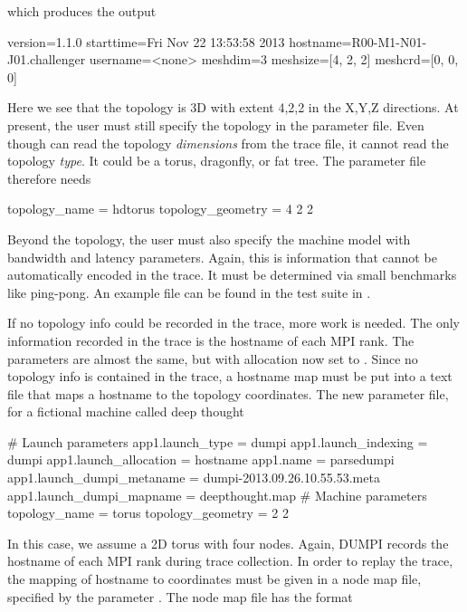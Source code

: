 which produces the output

\begin{ViFile}
version=1.1.0
starttime=Fri Nov 22 13:53:58 2013
hostname=R00-M1-N01-J01.challenger
username=<none>
meshdim=3
meshsize=[4, 2, 2]
meshcrd=[0, 0, 0]
\end{ViFile}
Here we see that the topology is 3D with extent 4,2,2 in the X,Y,Z directions.
At present, the user must still specify the topology in the parameter file.
Even though \sstmacro can read the topology \emph{dimensions} from the trace file,
it cannot read the topology \emph{type}.  It could be a torus, dragonfly, or fat tree.
The parameter file therefore needs

\begin{ViFile}
topology_name = hdtorus
topology_geometry = 4 2 2
\end{ViFile}
Beyond the topology, the user must also specify the machine model with bandwidth and latency parameters.
Again, this is information that cannot be automatically encoded in the trace.
It must be determined via small benchmarks like ping-pong.
An example file can be found in the test suite in .

If no topology info could be recorded in the trace, more work is needed.
The only information recorded in the trace is the hostname of each MPI rank.
The parameters are almost the same, but with allocation now set to .
Since no topology info is contained in the trace, 
a hostname map must be put into a text file that maps a hostname to the topology coordinates.
The new parameter file, for a fictional machine called deep thought

\begin{ViFile}
# Launch parameters
app1.launch_type = dumpi
app1.launch_indexing = dumpi
app1.launch_allocation = hostname
app1.name = parsedumpi
app1.launch_dumpi_metaname = dumpi-2013.09.26.10.55.53.meta
app1.launch_dumpi_mapname = deepthought.map
# Machine parameters
topology_name = torus
topology_geometry = 2 2
\end{ViFile}


In this case, we assume a 2D torus with four nodes.
Again, DUMPI records the hostname of each MPI rank during trace collection.
In order to replay the trace, the mapping of hostname to coordinates must be given in a node map file,
specified by the parameter .
The node map file has the format

